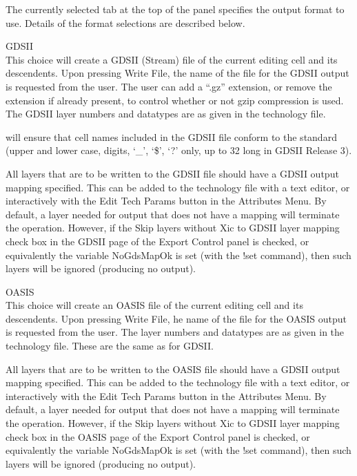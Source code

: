 The currently selected tab at the top of the panel specifies the
output format to use.  Details of the format selections are described
below.

\begin{description}
\item{\cb GDSII}\\
This choice will create a GDSII (Stream) file of the current editing
cell and its descendents.  Upon pressing {\cb Write File}, the name of
the file for the GDSII output is requested from the user.  The user
can add a ``{\vt .gz}'' extension, or remove the extension if already
present, to control whether or not {\vt gzip} compression is used. 
The GDSII layer numbers and datatypes are as given in the technology
file.

{\Xic} will ensure that cell names included in the GDSII file
conform to the standard (upper and lower case, digits, `\_', `\$', `?'
only, up to 32 long in GDSII Release 3).

All layers that are to be written to the GDSII file should have a
GDSII output mapping specified.  This can be added to the technology
file with a text editor, or interactively with the {\cb Edit Tech
Params} button in the {\cb Attributes Menu}.  By default, a layer
needed for output that does not have a mapping will terminate the
operation.  However, if the {\cb Skip layers without Xic to GDSII
layer mapping} check box in the {\cb GDSII} page of the {\cb Export
Control} panel is checked, or equivalently the variable {\et
NoGdsMapOk} is set (with the {\cb !set} command), then such layers
will be ignored (producing no output).

\item{\cb OASIS}\\
This choice will create an OASIS file of the current editing cell and
its descendents.  Upon pressing {\cb Write File}, he name of the file
for the OASIS output is requested from the user.  The layer numbers
and datatypes are as given in the technology file.  These are the same
as for GDSII.

All layers that are to be written to the OASIS file should have a
GDSII output mapping specified.  This can be added to the technology
file with a text editor, or interactively with the {\cb Edit Tech
Params} button in the {\cb Attributes Menu}.  By default, a layer
needed for output that does not have a mapping will terminate the
operation.  However, if the {\cb Skip layers without Xic to GDSII
layer mapping} check box in the {\cb OASIS} page of the {\cb Export
Control} panel is checked, or equivalently the variable {\et
NoGdsMapOk} is set (with the {\cb !set} command), then such layers
will be ignored (producing no output).


\end{description}

